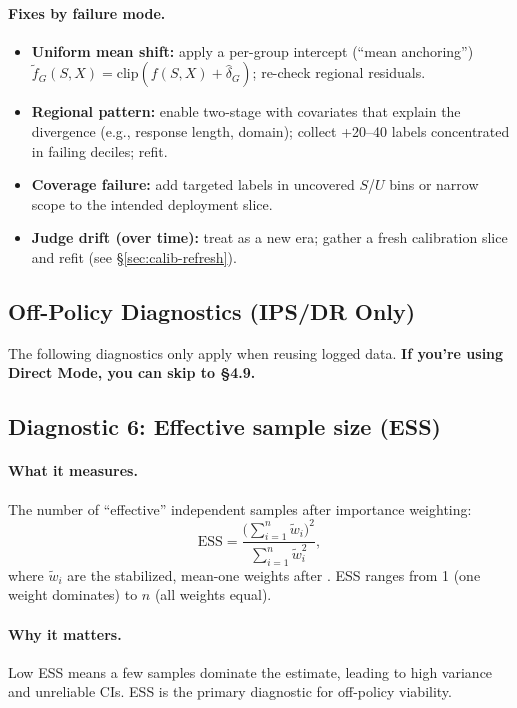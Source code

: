 \paragraph{Fixes by failure mode.}
\begin{itemize}
\item \textbf{Uniform mean shift:} apply a per-group intercept (``mean anchoring'') $\tilde f_G(S,X)=\mathrm{clip}(f(S,X)+\hat\delta_G)$; re-check regional residuals.
\item \textbf{Regional pattern:} enable two-stage \autocal{} with covariates that explain the divergence (e.g., response length, domain); collect +20--40 labels concentrated in failing deciles; refit.
\item \textbf{Coverage failure:} add targeted labels in uncovered $S$/$U$ bins or narrow scope to the intended deployment slice.
\item \textbf{Judge drift (over time):} treat as a new era; gather a fresh calibration slice and refit (see \S\ref{sec:calib-refresh}).
\end{itemize}

\subsection*{Off-Policy Diagnostics (IPS/DR Only)}

The following diagnostics only apply when reusing logged data. \textbf{If you're using Direct Mode, you can skip to §4.9.}

\subsection{Diagnostic 6: Effective sample size (ESS)}

\paragraph{What it measures.} The number of ``effective'' independent samples after importance weighting:
\begin{equation}
\text{ESS} = \frac{\big(\sum_{i=1}^n \tilde{w}_i\big)^2}{\sum_{i=1}^n \tilde{w}_i^2},
\end{equation}
where $\tilde{w}_i$ are the stabilized, mean-one weights after \simcal. ESS ranges from 1 (one weight dominates) to $n$ (all weights equal).

\paragraph{Why it matters.} Low ESS means a few samples dominate the estimate, leading to high variance and unreliable CIs. ESS is the primary diagnostic for off-policy viability.

